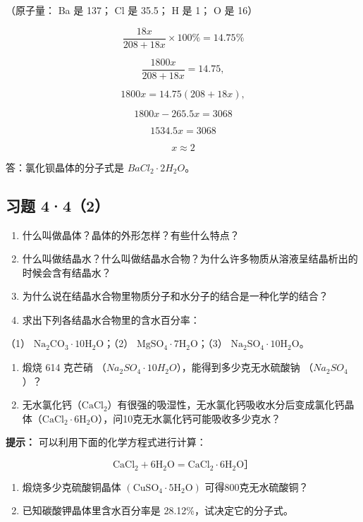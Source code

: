（原子量： Ba 是 137； Cl 是 35.5； H 是 1； O 是 16）

\[
\frac {18 x}{208 + 18 x} \times 100 \% = 14.75 \%
\]

\[
\frac {1800 x}{208 + 18 x} = 14.75,
\]

\[
1800 x = 14.75 (208 + 18 x),
\]

\[
1800x-265.5x=3068
\]

\[
1534.5x=3068
\]

\[
x\approx2
\]

答：氯化钡晶体的分子式是 \(BaCl_{2} \cdot 2H_{2}O\)。

\subsection{习题 4·4（2）}

\begin{enumerate}
\item
  什么叫做晶体？晶体的外形怎样？有些什么特点？
\item
  什么叫做结晶水？什么叫做结晶水合物？为什么许多物质从溶液呈结晶析出的时候会含有结晶水？
\item
  为什么说在结晶水合物里物质分子和水分子的结合是一种化学的结合？
\item
  求出下列各结晶水合物里的含水百分率：
\end{enumerate}

（1） \(\mathrm{Na_2CO_3\cdot 10H_2O}\)；（2）
\(\mathrm{MgSO_4\cdot 7H_2O}\)；（3）
\(\mathrm{Na_2SO_4\cdot 10H_2O}\)。

\begin{enumerate}[start=5]
\item
  煅烧 614 克芒硝
  （\(Na_{2}SO_{4} \cdot 10H_{2}O\)），能得到多少克无水硫酸钠
  （\(Na_{2}SO_{4}\)）？
\item
  无水氯化钙（\(\mathrm{CaCl}_2\)）有很强的吸湿性，无水氯化钙吸收水分后变成氯化钙晶体（\(\mathrm{CaCl}_2 \cdot 6\mathrm{H}_2\mathrm{O}\)），问10克无水氯化钙可能吸收多少克水？
\end{enumerate}

\begin{shulihuadef}
\textbf{提示：} 可以利用下面的化学方程式进行计算：
\end{shulihuadef}

\[
\mathrm{CaCl}_{2} + 6 \mathrm{H}_{2} \mathrm{O} = \mathrm{CaCl}_{2} \cdot 6 \mathrm{H}_{2} \mathrm{O} \text{］}
\]

\begin{enumerate}[start=7]
\item
  煅烧多少克硫酸铜晶体
  \(\left(\mathrm{CuSO}_{4}\cdot5\mathrm{H}_{2}\mathrm{O}\right)\)
  可得800克无水硫酸铜？
\item
  已知碳酸钾晶体里含水百分率是 28.12\%，试决定它的分子式。
\end{enumerate}

